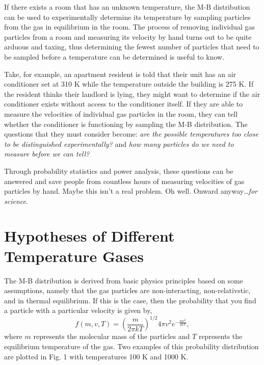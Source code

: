 \documentclass[%
 reprint,
 amsmath,amssymb,
 aps,
]{revtex4-2}
\begin{document}
If there exists a room that has an unknown temperature, the M-B distribution can be used to experimentally determine its temperature by sampling particles from the gas in equilibrium in the room. The process of removing individual gas particles from a room and measuring its velocity by hand turns out to be quite arduous and taxing, thus determining the fewest number of particles that need to be sampled before a temperature can be determined is useful to know.

Take, for example, an apartment resident is told that their unit has an air conditioner set at 310 K while the temperature outside the building is 275 K. If the resident thinks their landlord is lying, they might want to determine if the air conditioner exists without access to the conditioner itself. If they are able to measure the velocities of individual gas particles in the room, they can tell whether the conditioner is functioning by sampling the M-B distribution. The questions that they must consider become: \textit{are the possible temperatures too close to be distinguished experimentally?} and \textit{how many particles do we need to measure before we can tell?}

Through probability statistics and power analysis, these questions can be answered and save people from countless hours of measuring velocities of gas particles by hand. Maybe this isn't a real problem. Oh well. Onward anyway\dots \textit{for science}.

\section{Hypotheses of Different Temperature Gases}

The M-B distribution is derived from basic physics principles based on some assumptions, namely that the gas particles are non-interacting, non-relativstic, and in thermal equilibrium. If this is the case, then the probability that you find a particle with a particular velocity is given by,
\[
	f(m, v, T) = \left( \frac{m}{2\pi k T} \right)^{1/2}4\pi v^2 e^{-\frac{mv^2}{2kT}},
\]
where $m$ represents the molecular mass of the particles and $T$ represents the equilibrium temperature of the gas. Two examples of this probability distribution are plotted in Fig. 1 with temperatures 100 K and 1000 K. 
\end{document}
